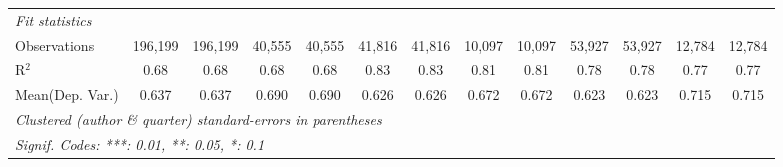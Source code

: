 \begin{tabular}{lcccccccccccc}
   \midrule
   \emph{Fit statistics}\\
   Observations                             & 196,199       & 196,199       & 40,555      & 40,555  & 41,816       & 41,816         & 10,097  & 10,097         & 53,927      & 53,927       & 12,784      & 12,784\\  
   R$^2$                                    & 0.68          & 0.68          & 0.68        & 0.68    & 0.83         & 0.83           & 0.81    & 0.81           & 0.78        & 0.78         & 0.77        & 0.77\\  
Mean(Dep. Var.) & 0.637 & 0.637 & 0.690 & 0.690 & 0.626 & 0.626 & 0.672 & 0.672 & 0.623 & 0.623 & 0.715 & 0.715 \\
   \midrule \midrule
   \multicolumn{13}{l}{\emph{Clustered (author \& quarter) standard-errors in parentheses}}\\
   \multicolumn{13}{l}{\emph{Signif. Codes: ***: 0.01, **: 0.05, *: 0.1}}\\
\end{tabular}
\par\endgroup
